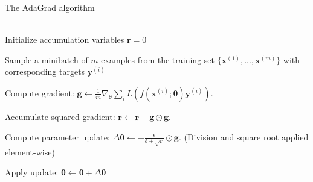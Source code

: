 \begin{algorithm}
\caption{The AdaGrad algorithm}\label{alg:AdaGrad}
    \label{algo:adagrad}
\begin{algorithmic}
    \\
    Initialize accumulation variables $\boldsymbol{r}=0$
    

        Sample a minibatch of $m$ examples from the training set
        $\{\boldsymbol{x}^{(1)}, ..., \boldsymbol{x}^{(m)}\}$ with corresponding
        targets $\boldsymbol{y}^{(i)}$
    
        Compute gradient: $\boldsymbol{g} \gets
        \frac{1}{m}\nabla_{\boldsymbol\theta}
        \sum_{i}L(f(\boldsymbol{x}^{(i)};\boldsymbol{\theta})\boldsymbol{y}^{(i)})$.
        
        Accumulate squared gradient: $\boldsymbol{r} \gets
        \boldsymbol{r}+\boldsymbol{g}\odot\boldsymbol{g}$.

        Compute parameter update: 
        $\Delta\boldsymbol{\theta}\gets -\frac{\epsilon}{\delta+\sqrt{\boldsymbol{r}}}
        \odot\boldsymbol{g}$. (Division and square root applied element-wise)
    
        Apply update: $\boldsymbol{\theta}\gets
        \boldsymbol\theta+\Delta\boldsymbol\theta$
    \EndWhile
\end{algorithmic}
\end{algorithm}


